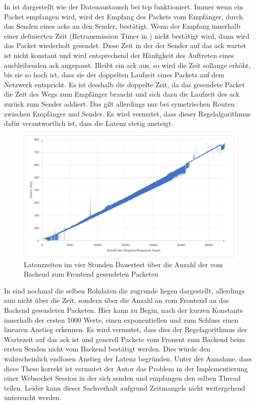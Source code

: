 In  ist dargestellt wie der Datenaustausch bei tcp funktioniert.
Immer wenn ein Packet empfangen wird, wird der Empfang des Packets vom Empfänger, durch das Senden eines \acp{ack} an den Sender, bestätigt.
Wenn der Empfang innerhalb einer definierten Zeit (Retransmission Timer in ) nicht bestätigt wird, 
dann wird das Packet wiederholt gesendet.
Diese Zeit in der der Sender auf das \ac{ack} wartet ist nicht konstant und wird entsprechend der Häufigkeit des Auftreten eines ausbleibenden \ac{ack} angepasst.
Bleibt ein \ac{ack} aus, so wird die Zeit sollange erhöht, bis sie so hoch ist, dass sie der doppelten Laufzeit eines Packets auf dem Netzwerk entspricht.
Es ist desshalb die doppelte Zeit, da das gesendete Packet die Zeit des Wegs zum Empfänger braucht und sich dazu die Laufzeit des \ac{ack} zurück zum Sender addiert.
Das gilt allerdings nur bei symetrischen Routen zwischen Empfänger und Sender.
Es wird vermutet, dass dieser Regelalgorithmus dafür verantwortlich ist, dass die Latenz stetig ansteigt.
\begin{figure}[ht]
  \centering
  \includegraphics[width=\textwidth]{content/hauptteil/umsetzungPoC/pocTest/res/LatenzNormal4hReqRes.pdf}
  \caption{Latenzzeiten im vier Stunden Dauertest über die Anzahl der vom Backend zum Frontend gesendeten Packeten}
  \label{fig:testing:latency4hNorm:cnt}
\end{figure}
In  sind nochmal die selben Rohdaten die  zugrunde liegen dargestellt, 
allerdings nun nicht über die Zeit, 
sondern über die Anzahl an vom Frontend an das Backend gesendeten Packeten. 
Hier kann zu Begin, nach der kurzen Konstante innerhalb der ersten 1000 Werte, einen exponentiellen und zum Schluss einen linearen Anstieg erkennen.
Es wird vermutet, dass dies der Regelagorithmus der Wartezeit auf das \ac{ack} ist und generell Packete vom Fronent zum Backend beim ersten Senden nicht vom Backend bestätigt werden.
Dies würde den wahrscheinlich endlosen Anstieg der Latenz begründen.
Unter der Annahme, dass diese These korrekt ist vermutet der Autor das Problem in der Implementierung einer Websocket Session in der sich senden und empfangen den selben Thread teilen.
Leider kann dieser Sachverhalt aufgrund Zeitmangels nicht weitergehend untersucht werden.